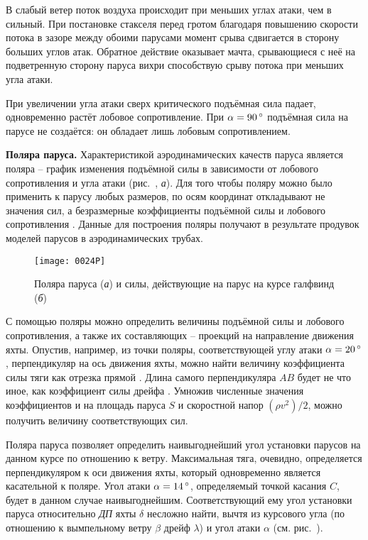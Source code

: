 В слабый ветер поток воздуха происходит при меньших углах атаки, чем в сильный. При постановке стакселя перед гротом благодаря повышению скорости потока в зазоре между обоими парусами момент срыва сдвигается в сторону больших углов атак. Обратное действие оказывает мачта, срывающиеся с неё на подветренную сторону паруса вихри способствую срыву потока при меньших угла атаки. 

При увеличении угла атаки сверх критического подъёмная сила падает, одновременно растёт лобовое сопротивление. При $\alpha = 90\,^\circ$ подъёмная сила на парусе не создаётся: он обладает лишь лобовым сопротивлением.

\textbf{Поляра паруса.}
Характеристикой аэродинамических качеств паруса является поляра \---
график изменения подъёмной силы в зависимости от лобового
сопротивления и угла атаки (рис.~, \textit{а}). Для того чтобы
поляру можно было применить к парусу любых размеров, по осям координат
откладывают не значения сил, а безразмерные коэффициенты подъёмной
силы  и лобового сопротивления . Данные для
построения поляры получают в результате продувок моделей парусов в
аэродинамических трубах.

\begin{figure}[htb]
  \centering
  \texttt{[image: 0024P]}
  \caption{Поляра паруса (\textit{а}) и силы, действующие на парус на курсе галфвинд (\textit{б})}
  \label{fig:24}
\end{figure}

С помощью поляры можно определить величины подъёмной силы и лобового
сопротивления, а также их составляющих \--- проекций на направление
движения яхты. Опустив, например, из точки поляры, соответствующей
углу атаки $\alpha = 20\,^\circ$, перпендикуляр на ось движения яхты, можно
найти величину коэффициента силы тяги  как отрезка прямой
. Длина самого перпендикуляра $AB$ будет не что иное, как
коэффициент силы дрейфа . Умножив численные значения
коэффициентов  и  на площадь паруса $S$ и
скоростной напор $(\rho v^2)/2$, можно получить величину
соответствующих сил.

Поляра паруса позволяет определить наивыгоднейший угол установки
парусов на данном курсе по отношению к ветру. Максимальная тяга,
очевидно, определяется перпендикуляром к оси движения яхты, который
одновременно является касательной к поляре. Угол атаки
$\alpha = 14\,^\circ$, определяемый точкой касания $C$, будет в данном
случае наивыгоднейшим. Соответствующий ему угол установки паруса
относительно \textit{ДП} яхты $\delta$ несложно найти, вычтя из
курсового угла (по отношению к вымпельному ветру $\beta$ дрейф
$\lambda$) и угол атаки $\alpha$ (см. рис.~).

